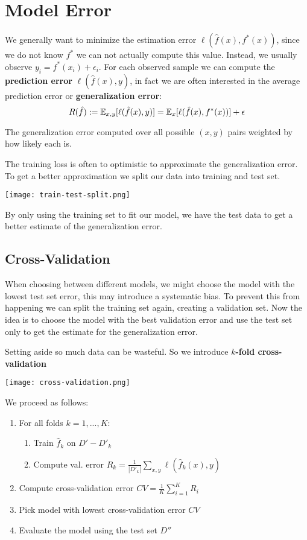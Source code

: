 \section{Model Error}

We generally want to minimize the estimation error $\ell(\hat{f}(x), f^*(x))$, since we do not know $f^*$ we can not actually compute this value. Instead, we usually observe $y_i = f^*(x_i) + \epsilon_i$. For each observed sample we can compute the \textbf{prediction error} $\ell(\hat{f}(x), y)$, in fact we are often interested in the average prediction error or \textbf{generalization error}:
$$R(\hat{f}) := \mathbb{E}_{x,y}[\ell(\hat{f}(x), y)] = \mathbb{E}_x[\ell(\hat{f}(x), f^*(x))] + \epsilon$$

The generalization error computed over all possible $(x,y)$ pairs weighted by how likely each is. 

The training loss is often to optimistic to approximate the generalization error. To get a better approximation we split our data into training and test set. 

\texttt{[image: train-test-split.png]}

By only using the training set to fit our model, we have the test data to get a better estimate of the generalization error.

\subsection{Cross-Validation}

When choosing between different models, we might choose the model with the lowest test set error, this may introduce a systematic bias. To prevent this from happening we can split the training set again, creating a validation set. Now the idea is to choose the model with the best validation error and use the test set only to get the estimate for the generalization error.

Setting aside so much data can be wasteful. So we introduce \textbf{$k$-fold cross-validation}

\texttt{[image: cross-validation.png]}

We proceed as follows:
\begin{enumerate}
	\item For all folds $k = 1,..., K$: 
		\begin{enumerate}
			\item Train $\hat{f}_k$ on $D' - D'_k$
			\item Compute val. error $R_k = \frac{1}{|D'_k|} \sum_{x,y} \ell(\hat{f}_k(x), y)$
		\end{enumerate}
	\item Compute cross-validation error $CV = \frac{1}{K} \sum_{i=1}^K R_i$
	\item Pick model with lowest cross-validation error $CV$
	\item Evaluate the model using the test set $D''$
\end{enumerate}

